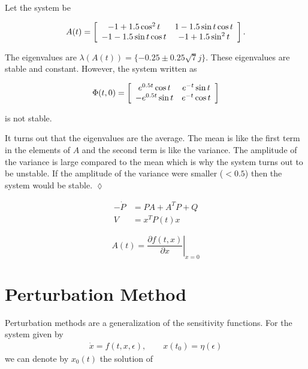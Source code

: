 \begin{example}
Let the system be

\begin{equation*}
A(t) = \left[\begin{array}{c c} -1+1.5\cos^2t & 1-1.5\sin t\cos t \\ -1-1.5\sin t\cos t & -1+1.5\sin^2t \end{array}\right].
\end{equation*}

The eigenvalues are $\lambda(A (t)) = \{-0.25\pm{} 0.25\sqrt{7}j\}$.
These eigenvalues are stable and constant.
However, the system written as

\begin{equation*}
\Phi(t,0) = \left[\begin{array}{c c} e^{0.5t}\cos t & e^{-t}\sin t \\ -e^{0.5t}\sin t & e^{-t}\cos t \end{array}\right]
\end{equation*}

is not stable.

It turns out that the eigenvalues are the average.
The mean is like the first term in the elements of $A$ and the second term is like the variance.
The amplitude of the variance is large compared to the mean which is why the system turns out to be unstable.
If the amplitude of the variance were smaller ($<0.5$) then the system would be stable.
$\lozenge$
\end{example}

\begin{theorem}
\begin{align*}
-\dot{P} &= PA + A^T P + Q \\
V &= x^T P(t)x
\end{align*}
\end{theorem}

\begin{theorem}

\begin{equation*}
A(t) = \left.\frac{\partial f(t,x)}{\partial x}\right|_{x=0}
\end{equation*}

\end{theorem}

\section{Perturbation Method}
Perturbation methods are a generalization of the sensitivity functions.
For the system given by
\begin{align}
\label{eq:10system}
\dot{x} = f(t,x,\epsilon), \qquad x(t_0) = \eta(\epsilon)
\end{align}
we can denote by $x_0(t)$ the solution of

